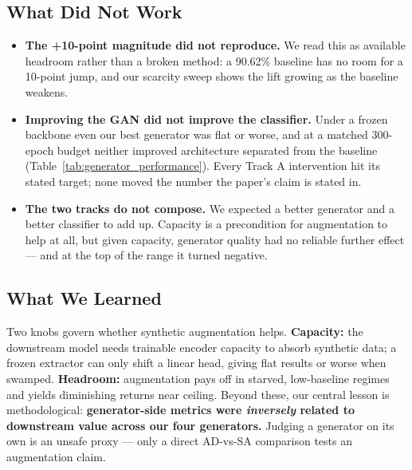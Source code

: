 \documentclass[11pt]{article}
\begin{document}
\subsection{What Did Not Work}
\begin{itemize}[nosep, leftmargin=1.5em]
  \item \textbf{The +10-point magnitude did not reproduce.} We read this as available headroom rather than a broken method: a 90.62\% baseline has no room for a 10-point jump, and our scarcity sweep shows the lift growing as the baseline weakens.
  \item \textbf{Improving the GAN did not improve the classifier.} Under a frozen backbone even our best generator was flat or worse, and at a matched 300-epoch budget neither improved architecture separated from the baseline (Table~\ref{tab:generator_performance}). Every Track A intervention hit its stated target; none moved the number the paper's claim is stated in.
  \item \textbf{The two tracks do not compose.} We expected a better generator and a better classifier to add up. Capacity is a precondition for augmentation to help at all, but given capacity, generator quality had no reliable further effect --- and at the top of the range it turned negative.
\end{itemize}

\subsection{What We Learned}
Two knobs govern whether synthetic augmentation helps. \textbf{Capacity:} the downstream model needs trainable encoder capacity to absorb synthetic data; a frozen extractor can only shift a linear head, giving flat results or worse when swamped. \textbf{Headroom:} augmentation pays off in starved, low-baseline regimes and yields diminishing returns near ceiling. Beyond these, our central lesson is methodological: \textbf{generator-side metrics were \emph{inversely} related to downstream value across our four generators.} Judging a generator on its own is an unsafe proxy --- only a direct AD-vs-SA comparison tests an augmentation claim.
\end{document}
